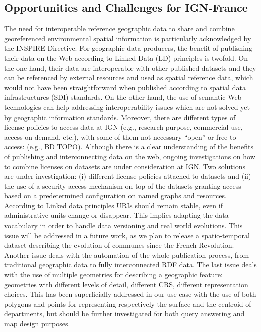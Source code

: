 \subsection{Opportunities and Challenges for IGN-France}
\label{sec:challenges}

 The need for interoperable reference geographic data to share and combine georeferenced environmental spatial information is particularly acknowledged by the INSPIRE Directive. For geographic data producers, the benefit of publishing their data on the Web according to Linked Data  (LD) principles is twofold. On the one hand, their data are interoperable with other published datasets and they can be referenced by external resources and used as spatial reference data, which would not have been straightforward when published according to spatial data infrastructures (SDI) standards. On the other hand, the use of semantic Web technologies can help addressing interoperability issues which are not solved yet by geographic information standards. 
Moreover, there are different types of license policies to access data at IGN (e.g., research purpose, commercial use, access on demand, etc.), with some of them not necessary ``open'' or free to access: (e.g., BD TOPO\circledR). Although there is a clear understanding of the benefits of publishing and interconnecting data on the web, ongoing investigations on how to combine licenses on datasets are under consideration at IGN. Two solutions are under investigation: (i) different license policies attached to datasets and (ii) the use of a security access mechanism on top of the datasets granting access based on a predetermined configuration on named graphs and resources. 
According to Linked data principles URIs should remain stable, even if administrative units change or disappear. This implies adapting the data vocabulary in order to handle data versioning and real world evolutions. This issue will be addressed in a future work, as we plan to release a spatio-temporal dataset describing the evolution of communes since the French Revolution. Another issue deals with the automation of the whole publication process, from traditional geographic data to fully interconnected RDF data.
The last issue deals with the use of multiple geometries for describing a geographic feature: geometries with different levels of detail, different CRS, different representation choices. This has been superficially addressed in our use case with the use of both polygons and points for representing respectively the surface and the centroid of departments, but should be further investigated for both query answering and map design purposes.


